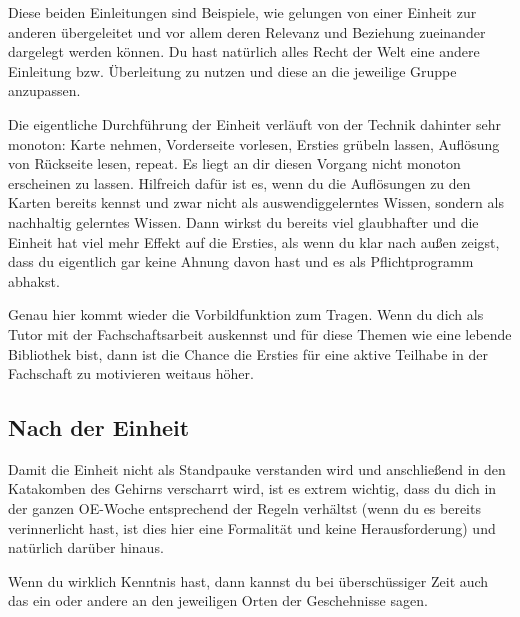 \documentclass[a4paper,11pt]{scrartcl} %
\begin{document}
Diese beiden Einleitungen sind Beispiele, wie gelungen von einer Einheit zur anderen übergeleitet und vor allem deren Relevanz und Beziehung zueinander dargelegt werden können. Du hast natürlich alles Recht der Welt eine andere Einleitung bzw. Überleitung zu nutzen und diese an die jeweilige Gruppe anzupassen.

Die eigentliche Durchführung der Einheit verläuft von der Technik dahinter sehr monoton: Karte nehmen, Vorderseite vorlesen, Ersties grübeln lassen, Auflösung von Rückseite lesen, repeat.
Es liegt an dir diesen Vorgang nicht monoton erscheinen zu lassen. Hilfreich dafür ist es, wenn du die Auflösungen zu den Karten bereits kennst und zwar nicht als auswendiggelerntes Wissen, sondern als nachhaltig gelerntes Wissen. Dann wirkst du bereits viel glaubhafter und die Einheit hat viel mehr Effekt auf die Ersties, als wenn du klar nach außen zeigst, dass du eigentlich gar keine Ahnung davon hast und es als Pflichtprogramm abhakst.

Genau hier kommt wieder die Vorbildfunktion zum Tragen. Wenn du dich als Tutor mit der Fachschaftsarbeit auskennst und für diese Themen wie eine lebende Bibliothek bist, dann ist die Chance die Ersties für eine aktive Teilhabe in der Fachschaft zu motivieren weitaus höher.

  \subsection{Nach der Einheit} %
Damit die Einheit nicht als Standpauke verstanden wird und anschließend in den Katakomben des Gehirns verscharrt wird, ist es extrem wichtig, dass du dich in der ganzen OE-Woche entsprechend der Regeln verhältst (wenn du es bereits verinnerlicht hast, ist dies hier eine Formalität und keine Herausforderung) und natürlich darüber hinaus.

Wenn du wirklich Kenntnis hast, dann kannst du bei überschüssiger Zeit auch das ein oder andere an den jeweiligen Orten der Geschehnisse sagen.
\end{document}
